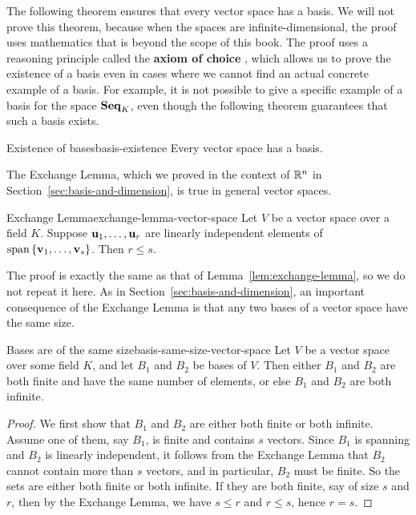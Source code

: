 The following theorem ensures that every vector space has a basis.  We
will not prove this theorem, because when the spaces are
infinite-dimensional, the proof uses mathematics that is beyond the
scope of this book. The proof uses a reasoning principle called the
\textbf{axiom of choice}%
, which allows us to prove the existence of a
basis even in cases where we cannot find an actual concrete example of
a basis.  For example, it is not possible to give a specific example
of a basis for the space $\mathbf{Seq}_K$, even though the following theorem
guarantees that such a basis exists.

\begin{theorem}{Existence of bases}{basis-existence}
  Every vector space has a basis.
\end{theorem}

The Exchange Lemma, which we proved in the context of $\mathbb{R}^n$ in
Section~\ref{sec:basis-and-dimension}, is true in general vector
spaces.

\begin{lemma}{Exchange Lemma}{exchange-lemma-vector-space}
  Let $V$ be a vector space over a field $K$. Suppose
  $\mbox{\bf u}_{1},\ldots,\mbox{\bf u}_{r}$ are linearly independent elements
  of $\sspan\set{\vect{v}_{1},\ldots,\vect{v}_{s}}$. Then $r\leq s$.
\end{lemma}

The proof is exactly the same as that of
Lemma~\ref{lem:exchange-lemma}, so we do not repeat it here.  As in
Section~\ref{sec:basis-and-dimension}, an important consequence of the
Exchange Lemma is that any two bases of a vector space have the same
size.

\begin{theorem}{Bases are of the same size}{basis-same-size-vector-space}
  Let $V$ be a vector space over some field $K$, and let $B_1$ and
  $B_2$ be bases of $V$. Then either $B_1$ and $B_2$ are both finite
  and have the same number of elements, or else $B_1$ and $B_2$ are
  both infinite.
\end{theorem}

\begin{proof}
  We first show that $B_1$ and $B_2$ are either both finite or both
  infinite. Assume one of them, say $B_1$, is finite and contains $s$
  vectors. Since $B_1$ is spanning and $B_2$ is linearly independent,
  it follows from the Exchange Lemma that $B_2$ cannot contain more
  than $s$ vectors, and in particular, $B_2$ must be finite.  So the
  sets are either both finite or both infinite. If they are both
  finite, say of size $s$ and $r$, then by the Exchange Lemma, we have
  $s\leq r$ and $r\leq s$, hence $r=s$.
\end{proof}

